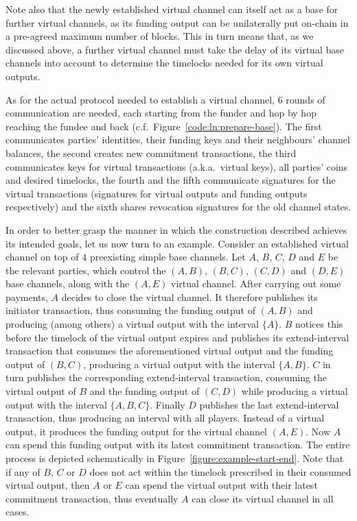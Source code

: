   Note also that the newly established virtual channel can itself act as a base
  for further virtual channels, as its funding output can be unilaterally put
  on-chain in a pre-agreed maximum number of blocks. This in turn means that, as
  we discussed above, a further virtual channel must take the delay of its
  virtual base channels into account to determine the timelocks needed for its
  own virtual outputs.

  As for the actual protocol needed to establish a virtual channel, $6$ rounds
  of communication are needed, each starting from the funder and hop by hop reaching
  the fundee and back (c.f.\ Figure~\ref{code:ln:prepare-base}). The first communicates
  parties' identities, their funding keys and their neighbours' channel
  balances, the second creates new commitment transactions, the third
  communicates keys for virtual transactions (a.k.a.\ virtual keys), all parties'
  coins and desired timelocks, the fourth and the
  fifth communicate signatures for the virtual transactions (signatures for
  virtual outputs and funding outputs respectively) and the sixth shares
  revocation signatures for the old channel states.

  In order to better grasp the manner in which the construction described
  achieves its intended goals, let us now turn to an example. Consider an
  established virtual channel on top of $4$ preexisting simple base channels.
  Let $A$, $B$, $C$, $D$ and $E$ be the relevant parties, which control the $(A,
  B)$, $(B, C)$, $(C, D)$ and $(D, E)$ base channels, along with the $(A, E)$
  virtual channel. After carrying out some payments, $A$ decides to close the
  virtual channel. It therefore publishes its initiator transaction, thus
  consuming the funding output of $(A, B)$ and producing (among others) a
  virtual output with the interval $\{A\}$. $B$ notices this before the timelock
  of the virtual output expires and publishes its extend-interval
  transaction that consumes the aforementioned virtual output and the funding
  output of $(B, C)$, producing a virtual output with the interval $\{A, B\}$.
  $C$ in turn publishes the corresponding extend-interval transaction, consuming
  the virtual output of $B$ and the funding output of $(C, D)$ while producing a
  virtual output with the interval $\{A, B, C\}$. Finally $D$ publishes the last
  extend-interval transaction, thus producing an interval with all players.
  Instead of a virtual output, it produces the funding output for the virtual
  channel $(A, E)$. Now $A$ can spend this funding output with its latest
  commitment transaction. The entire process is depicted schematically in
  Figure~\ref{figure:example-start-end}. Note that if any of $B$, $C$ or $D$
  does
  not act within the timelock prescribed in their consumed virtual output, then
  $A$ or $E$ can spend the virtual output with their latest commitment
  transaction, thus eventually $A$ can close its virtual channel in all cases.

